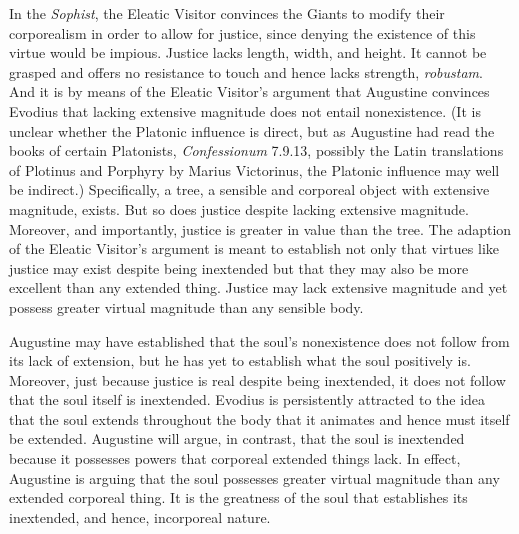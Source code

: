 \documentclass[12pt]{article}
\begin{document}
In the \emph{Sophist}, the Eleatic Visitor convinces the Giants to modify their corporealism in order to allow for justice, since denying the existence of this virtue would be impious. Justice lacks length, width, and height. It cannot be grasped and offers no resistance to touch and hence lacks strength, \emph{robustam}. And it is by means of the Eleatic Visitor’s argument that Augustine convinces Evodius that lacking extensive magnitude does not entail nonexistence. (It is unclear whether the Platonic influence is direct, but as Augustine had read the books of certain Platonists, \emph{Confessionum} 7.9.13, possibly the Latin translations of Plotinus and Porphyry by Marius Victorinus, the Platonic influence may well be indirect.) Specifically, a tree, a sensible and corporeal object with extensive magnitude, exists. But so does justice despite lacking extensive magnitude. Moreover, and importantly, justice is greater in value than the tree. The adaption of the Eleatic Visitor’s argument is meant to establish not only that virtues like justice may exist despite being inextended but that they may also be more excellent than any extended thing. Justice may lack extensive magnitude and yet possess greater virtual magnitude than any sensible body. 

Augustine may have established that the soul’s nonexistence does not follow from its lack of extension, but he has yet to establish what the soul positively is. Moreover, just because justice is real despite being inextended, it does not follow that the soul itself is inextended. Evodius is persistently attracted to the idea that the soul extends throughout the body that it animates and hence must itself be extended. Augustine will argue, in contrast, that the soul is inextended because it possesses powers that corporeal extended things lack. In effect, Augustine is arguing that the soul possesses greater virtual magnitude than any extended corporeal thing. It is the greatness of the soul that establishes its inextended, and hence, incorporeal nature.
\end{document}
